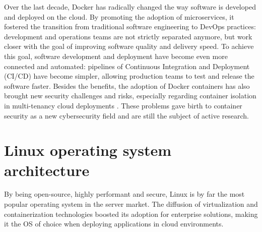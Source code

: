 Over the last decade, Docker has radically changed the way software is developed and deployed on the cloud. By promoting the adoption of microservices, it fostered the transition from traditional software engineering to DevOps practices: development and operations teams are not strictly separated anymore, but work closer with the goal of improving software quality and delivery speed.
To achieve this goal, software development and deployment have become even more connected and automated: pipelines of Continuous Integration and Deployment (CI/CD) have become simpler, allowing production teams to test and release the software faster. 
Besides the benefits, the adoption of Docker containers has also brought new security challenges and risks, especially regarding container isolation in multi-tenancy cloud deployments \cite{luo2016whispers,gao2018study}.
These problems gave birth to container security as a new cybersecurity field and are still the subject of active research.

\section{Linux operating system architecture}
By being open-source, highly performant and secure, 
Linux is by far the most popular operating system in the server market. The diffusion of virtualization and containerization technologies boosted its adoption for enterprise solutions, making it the OS of choice when deploying applications in cloud environments.

